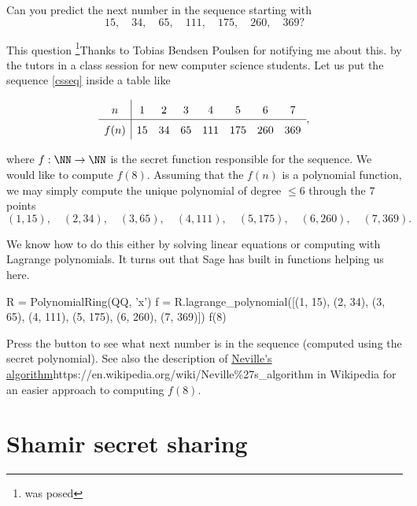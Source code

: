 \documentclass{article}
\begin{document}
\begin{example}

Can you predict the next number in the sequence starting with
\begin{equation}\label{csseq}
15,\quad 34,\quad 65,\quad 111,\quad 175,\quad 260,\quad 369?
\end{equation}

This question \footnote{was posed}{Thanks to Tobias Bendsen Poulsen for notifying me about this.} by the tutors in a class session for new computer science students. Let us put the sequence \eqref{csseq} inside a table like

$$
\def\arraystretch{1.5}
\begin{array}{c|ccccccc}
n & 1 & 2 & 3 & 4 & 5 & 6 & 7\\ \hline
f(n) & 15 & 34 & 65 & 111 & 175 & 260 & 369
\end{array},
$$

where $f:\NN\rightarrow \NN$ is the secret function responsible for the sequence. We would like to compute $f(8)$. Assuming that the $f(n)$ is a polynomial function, we may simply compute the unique polynomial of  degree $\leq 6$ through the $7$ points
$$
(1, 15),\quad (2, 34),\quad (3, 65),\quad (4, 111),\quad (5, 175),\quad (6, 260),\quad (7, 369).
$$

We know how to do this either by solving linear equations or computing with Lagrange polynomials. It turns out that Sage has built in functions helping us here.

\begin{sage}
R = PolynomialRing(QQ, 'x')
f = R.lagrange_polynomial([(1, 15), (2, 34), (3, 65), (4, 111), (5, 175), (6, 260), (7, 369)])
f(8)
\end{sage}

Press the button to see what next number is in the sequence (computed using the secret polynomial). See also the
description of \url{Neville's algorithm}{https://en.wikipedia.org/wiki/Neville\%27s_algorithm} in Wikipedia for an easier approach to
computing $f(8)$.


\end{example}

\section{Shamir secret sharing}
\end{document}
